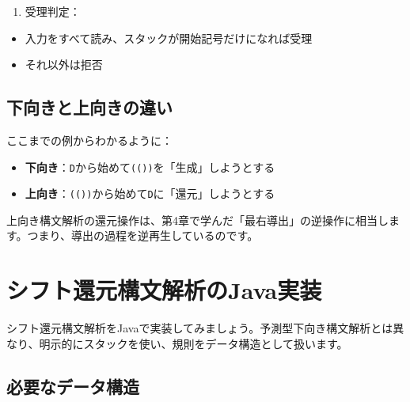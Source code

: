 \begin{enumerate}
\def\labelenumi{\arabic{enumi}.}
\setcounter{enumi}{3}
\tightlist
\item
  受理判定：
\end{enumerate}

\begin{itemize}
\tightlist
\item
  入力をすべて読み、スタックが開始記号だけになれば受理
\item
  それ以外は拒否
\end{itemize}

\hypertarget{chapter5-ux4e0bux5411ux304dux3068ux4e0aux5411ux304dux306eux9055ux3044}{%
\subsection{下向きと上向きの違い}\label{chapter5-ux4e0bux5411ux304dux3068ux4e0aux5411ux304dux306eux9055ux3044}}

ここまでの例からわかるように：

\begin{itemize}
\tightlist
\item
  \textbf{下向き}：\texttt{D}から始めて\texttt{(())}を「生成」しようとする
\item
  \textbf{上向き}：\texttt{(())}から始めて\texttt{D}に「還元」しようとする
\end{itemize}

上向き構文解析の還元操作は、第4章で学んだ「最右導出」の逆操作に相当します。つまり、導出の過程を逆再生しているのです。

\hypertarget{chapter5-ux30b7ux30d5ux30c8ux9084ux5143ux69cbux6587ux89e3ux6790ux306ejavaux5b9fux88c5}{%
\section{シフト還元構文解析のJava実装}\label{chapter5-ux30b7ux30d5ux30c8ux9084ux5143ux69cbux6587ux89e3ux6790ux306ejavaux5b9fux88c5}}

シフト還元構文解析をJavaで実装してみましょう。予測型下向き構文解析とは異なり、明示的にスタックを使い、規則をデータ構造として扱います。

\hypertarget{chapter5-ux5fc5ux8981ux306aux30c7ux30fcux30bfux69cbux9020}{%
\subsection{必要なデータ構造}\label{chapter5-ux5fc5ux8981ux306aux30c7ux30fcux30bfux69cbux9020}}

